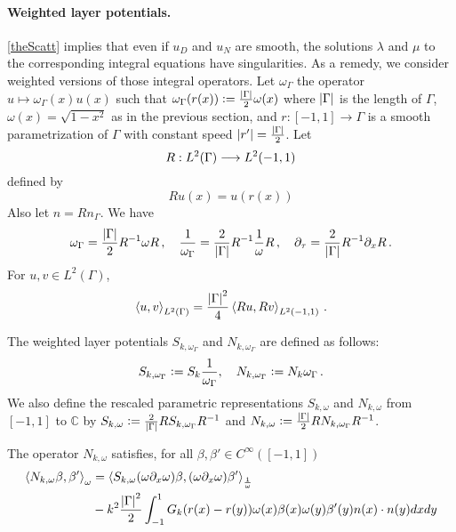 \documentclass[a4paper]{article}
\begin{document}
\paragraph{Weighted layer potentials.} \autoref{theScatt} implies that even if $u_D$ and $u_N$ are smooth, the solutions $\lambda$ and $\mu$ to the corresponding integral equations have singularities. As a remedy, we consider weighted versions of those integral operators. Let $\omega_\Gamma$ the operator $u \mapsto \omega_\Gamma(x) u(x)$ such that $\omega_\Gamma(r(x)) \mathrel{\mathop:}= \frac{\left\lvert \Gamma \right\rvert}{2}\omega(x)$ where $\left\lvert \Gamma \right\rvert$ is the length of $\Gamma$, $\omega(x) = \sqrt{1 - x^2}$ as in the previous section, and $r : [-1,1] \to \Gamma$ is a smooth parametrization of $\Gamma$ with constant speed $\left\lvert r' \right\rvert = \frac{\left\lvert \Gamma \right\rvert}{2}$. Let 
\[R : L^2(\Gamma) \longrightarrow L^2(-1,1)\]
defined by 
\[Ru(x) = u(r(x))\]
Also let $n = Rn_\Gamma$. We have
\[\omega_\Gamma = \frac{\left\lvert \Gamma \right\rvert}{2}R^{-1} \omega R\,, \quad \frac{1}{\omega_\Gamma} = \frac{2}{\left\lvert \Gamma \right\rvert}R^{-1} \frac{1}{\omega} R\,, \quad \partial_\tau = \frac{2}{\left\lvert \Gamma \right\rvert} R^{-1}\partial_x R\,.\]
For $u,v \in L^2(\Gamma)$, 
\[\left\langle u,v\right\rangle_{L^2(\Gamma)} = \frac{\left\lvert \Gamma \right\rvert^2}{4}\left\langle Ru,Rv\right\rangle_{L^2(-1,1)} \,.\] 
\begin{Def}
	The weighted layer potentials $S_{k,\omega_\Gamma}$ and $N_{k,\omega_\Gamma}$ are defined as follows:
	\[S_{k,\omega_\Gamma} \mathrel{\mathop:}= S_k \frac{1}{\omega_\Gamma}, \quad N_{k,\omega_\Gamma} \mathrel{\mathop:}=  N_{k}\omega_\Gamma\,.\]
	We also define the rescaled parametric representations $S_{k,\omega}$ and $N_{k,\omega}$ from $[-1,1]$ to $\mathbb{C}$ by $S_{k,\omega} \mathrel{\mathop:}= \frac{2}{\left\lvert \Gamma \right\rvert} R S_{k,\omega_\Gamma}R^{-1}$ and $N_{k,\omega} \mathrel{\mathop:}= \frac{\left\lvert \Gamma \right\rvert}{2} R N_{k,\omega_\Gamma} R^{-1}$. 
\end{Def}
\begin{Lem}
	The operator $N_{k,\omega}$ satisfies, for all $\beta, \beta' \in C^\infty([-1,1])$
	\[\begin{split}
		\left\langle N_{k,\omega} \beta,\beta'\right\rangle_\omega& = \left\langle S_{k,\omega}(\omega \partial_x \omega)\beta,(\omega \partial_x \omega) \beta'\right\rangle_\frac{1}{\omega}\\
		&-k^2 \frac{\left\lvert \Gamma \right\rvert^2}{2}\int_{-1}^{1} G_k(r(x) - r(y))\omega(x)\beta(x)\omega(y)\beta'(y) n(x) \cdot n(y) dx dy
	\end{split}\]
\end{Lem}
\end{document}
